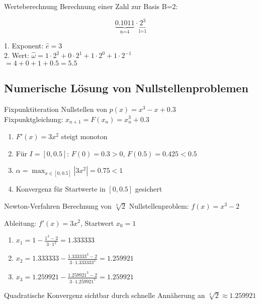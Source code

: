 \begin{example2}{Werteberechnung} Berechnung einer Zahl zur Basis B=2:
\begin{minipage}{0.45\textwidth}
    $$\underbrace{0.1011}_{\text{n=4}} \cdot \underbrace{2^{3}}_{\text{l=1}}$$
\end{minipage}
\begin{minipage}[t]{0.5\textwidth}
    1. Exponent: $\hat{e} = 3$ \\ 
    2. Wert: $\hat{\omega} = 1\cdot2^2 + 0\cdot2^1 + 1\cdot2^0 + 1\cdot2^{-1}$ \\
    $= 4 + 0 + 1 + 0.5 = 5.5$
\end{minipage}
\end{example2}

\raggedcolumns


\subsection{Numerische Lösung von Nullstellenproblemen}

\begin{example2}{Fixpunktiteration} Nullstellen von $p(x)=x^3-x+0.3$\\
Fixpunktgleichung: $x_{n+1} = F(x_n) = x_n^3 + 0.3$
\begin{enumerate}
    \item $F'(x) = 3x^2$ steigt monoton
    \item Für $I=[0,0.5]$: $F(0)=0.3 > 0$, $F(0.5)=0.425 < 0.5$
    \item $\alpha = \max_{x \in [0,0.5]} |3x^2| = 0.75 < 1$
    \item Konvergenz für Startwerte in $[0,0.5]$ gesichert
\end{enumerate}
\end{example2}



\begin{example2}{Newton-Verfahren} Berechnung von $\sqrt[3]{2}$
Nullstellenproblem: $f(x)=x^3-2$
\vspace{1mm}\\
\begin{minipage}[t]{0.65\textwidth}
    \vspace{-3mm}
    Ableitung: $f'(x)=3x^2$, Startwert $x_0=1$
    \begin{enumerate}
        \item $x_1 = 1 - \frac{1^3-2}{3 \cdot 1^2} = 1.333333$
        \item $x_2 = 1.333333 - \frac{1.333333^3-2}{3 \cdot 1.333333^2} = 1.259921$
        \item $x_3 = 1.259921 - \frac{1.259921^3-2}{3 \cdot 1.259921^2} = 1.259921$
    \end{enumerate}
\end{minipage}
\begin{minipage}[t]{0.3\textwidth}
    Quadratische Konvergenz sichtbar durch schnelle Annäherung an $\sqrt[3]{2} \approx 1.259921$
\end{minipage}
\end{example2}

